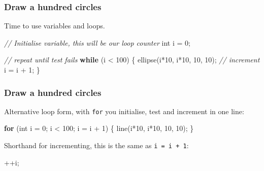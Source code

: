\documentclass[ignorenonframetext,]{beamer}
\newenvironment{Shaded}{}{}
\newcommand{\KeywordTok}[1]{\textcolor[rgb]{0.00,0.44,0.13}{\textbf{{#1}}}}
\newcommand{\DataTypeTok}[1]{\textcolor[rgb]{0.56,0.13,0.00}{{#1}}}
\newcommand{\DecValTok}[1]{\textcolor[rgb]{0.25,0.63,0.44}{{#1}}}
\newcommand{\CommentTok}[1]{\textcolor[rgb]{0.38,0.63,0.69}{\textit{{#1}}}}
\newcommand{\FunctionTok}[1]{\textcolor[rgb]{0.02,0.16,0.49}{{#1}}}
\newcommand{\NormalTok}[1]{{#1}}
\begin{document}
\begin{frame}[fragile]\frametitle{Draw a hundred circles}

Time to use variables and loops.

\begin{Shaded}
\begin{Highlighting}[]
\CommentTok{// Initialise variable, this will be our loop counter}
\DataTypeTok{int} \NormalTok{i = }\DecValTok{0}\NormalTok{;}

\CommentTok{// repeat until test fails}
\KeywordTok{while} \NormalTok{(i < }\DecValTok{100}\NormalTok{) \{}
  \FunctionTok{ellipse}\NormalTok{(i*}\DecValTok{10}\NormalTok{, i*}\DecValTok{10}\NormalTok{, }\DecValTok{10}\NormalTok{, }\DecValTok{10}\NormalTok{);}
  \CommentTok{// increment}
  \NormalTok{i = i + }\DecValTok{1}\NormalTok{;}
\NormalTok{\}}
\end{Highlighting}
\end{Shaded}

\end{frame}

\begin{frame}[fragile]\frametitle{Draw a hundred circles}

Alternative loop form, with \texttt{for} you initialise, test and
increment in one line:

\begin{Shaded}
\begin{Highlighting}[]
\KeywordTok{for} \NormalTok{(}\DataTypeTok{int} \NormalTok{i = }\DecValTok{0}\NormalTok{; i < }\DecValTok{100}\NormalTok{; i = i + }\DecValTok{1}\NormalTok{) \{}
  \FunctionTok{line}\NormalTok{(i*}\DecValTok{10}\NormalTok{, i*}\DecValTok{10}\NormalTok{, }\DecValTok{10}\NormalTok{, }\DecValTok{10}\NormalTok{);}
\NormalTok{\} }
\end{Highlighting}
\end{Shaded}

Shorthand for incrementing, this is the same as \texttt{i = i + 1}:

\begin{Shaded}
\begin{Highlighting}[]
\NormalTok{++i;}
\end{Highlighting}
\end{Shaded}

\end{frame}
\end{document}
